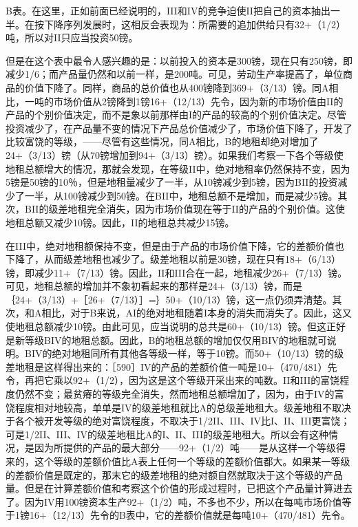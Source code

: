 B表。在这里，正如前面已经说明的，III和IV的竞争迫使II把自己的资本抽出一半。在按下降序列发展时，这相反会表现为：所需要的追加供给只有32+（1/2）吨，所以对II只应当投资50镑。

但是在这个表中最令人感兴趣的是：以前投入的资本是300镑，现在只有250镑，即减少1/6；而产品量仍然和以前一样，是200吨。可见，劳动生产率提高了，单位商品的价值下降了。同样，商品的总价值也从400镑降到369+（3/13）镑。同A相比，一吨的市场价值从2镑降到1镑16+（12/13）先令，因为新的市场价值由II的产品的个别价值决定，而不是象以前那样由I的产品的较高的个别价值决定。尽管投资减少了，在产品量不变的情况下产品总价值减少了，市场价值下降了，开发了比较富饶的等级，——尽管有这些情况，同A相比，B的地租却绝对增加了24+（3/13）镑（从70镑增加到94+（3/13）镑）。如果我们考察一下各个等级使地租总额增大的情况，那就会发现，在等级II中，绝对地租率仍然保持不变，因为5镑是50镑的10％，但是地租量减少了一半，从10镑减少到5镑，因为BII的投资减少了一半，从100镑减少到50镑。在BII中，地租总额不是增加，而是减少5镑。其次，BII的级差地租完全消失，因为市场价值现在等于II的产品的个别价值。这使地租总额又减少10镑。因此，II的地租总共减少15镑。

在III中，绝对地租额保持不变，但是由于产品的市场价值下降，它的差额价值也下降了，从而级差地租也减少了。级差地租以前是30镑，现在只有18+（6/13）镑，即减少11+（7/13）镑。因此，II和III合在一起，地租减少26+（7/13）镑。可见，地租总额的增加并不象初看起来的那样是24+（3/13）镑，而是｛24+（3/13）+［26+（7/13）］=｝50+（10/13）镑，这一点仍须弄清楚。其次，和A相比，对于B来说，AI的绝对地租随着I本身的消失而消失了。因此，这又使地租总额减少10镑。由此可见，应当说明的总共是60+（10/13）镑。但这正好是新等级BIV的地租总额。因此，B的地租总额的增加仅仅用BIV的地租就可说明。BIV的绝对地租同所有其他各等级一样，等于10镑。而50+（10/13）镑的级差地租是这样得出来的：［590］IV的产品的差额价值一吨是10+（470/481）先令，再把它乘以92+（1/2），因为这是这个等级开采出来的吨数。II和III的富饶程度仍然不变；最贫瘠的等级完全消失，然而地租总额增加了，因为，由于IV的富饶程度相对地较高，单单是IV的级差地租就比A的总级差地租大。级差地租不取决于各个被开发等级的绝对富饶程度，不取决于1/2II、III、IV比I、II、III更富饶；可是1/2II、III、IV的级差地租比A的I、II、III的级差地租大。所以会有这种情况，是因为所提供的产品的最大部分——92+（1/2）吨——是从这样一个等级得来的，这个等级的差额价值比A表上任何一个等级的差额价值都大。如果某一等级的差额价值是既定的，那末它的级差地租的绝对额自然就取决于这个等级的产品量。但是在计算差额价值和考察这个价值的形成过程时，已把这个产品量计算进去了。因为IV用100镑资本生产92+（1/2）吨，不多也不少，所以在每吨市场价值等于1镑16+（12/13）先令的B表中，它的差额价值就是每吨10+（470/481）先令。

